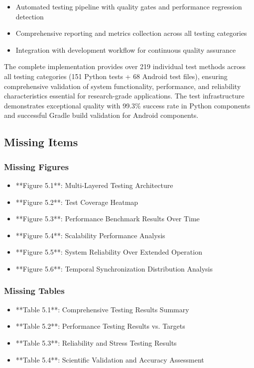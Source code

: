 \documentclass[12pt,a4paper]{article}
\begin{document}
\begin{itemize}
\item Automated testing pipeline with quality gates and performance regression detection
\item Comprehensive reporting and metrics collection across all testing categories
\item Integration with development workflow for continuous quality assurance

\end{itemize}
The complete implementation provides over 219 individual test methods across all testing categories (151 Python tests + 
68 Android test files), ensuring comprehensive validation of system functionality, performance, and reliability 
characteristics essential for research-grade applications. The test infrastructure demonstrates exceptional quality 
with 99.3\% success rate in Python components and successful Gradle build validation for Android components.

\subsection{Missing Items}

\subsubsection{Missing Figures}

\begin{itemize}
\item **Figure 5.1**: Multi-Layered Testing Architecture
\item **Figure 5.2**: Test Coverage Heatmap
\item **Figure 5.3**: Performance Benchmark Results Over Time
\item **Figure 5.4**: Scalability Performance Analysis
\item **Figure 5.5**: System Reliability Over Extended Operation
\item **Figure 5.6**: Temporal Synchronization Distribution Analysis

\end{itemize}
\subsubsection{Missing Tables}

\begin{itemize}
\item **Table 5.1**: Comprehensive Testing Results Summary
\item **Table 5.2**: Performance Testing Results vs. Targets
\item **Table 5.3**: Reliability and Stress Testing Results
\item **Table 5.4**: Scientific Validation and Accuracy Assessment

\end{itemize}
\end{document}
